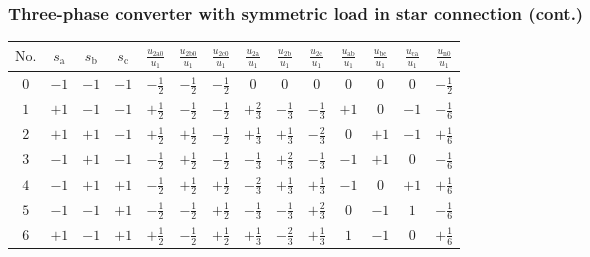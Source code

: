 \begin{frame}[b]
    \frametitle{Three-phase converter with symmetric load in star connection (cont.)}
    \vspace{1em}
    \begin{table}
        \renewcommand{\arraystretch}{1.25}
        \centering
        \begin{tabular}{c c c c c c c c c c c c c c}
            \toprule
            $\mathrm{No.}$ & $s_\mathrm{a}$ & $s_\mathrm{b}$ & $s_\mathrm{c}$ & $\frac{u_{2\mathrm{a}0}}{u_1}$ & $\frac{u_{2\mathrm{b}0}}{u_1}$ & $\frac{u_{2\mathrm{c}0}}{u_1}$ & $\frac{u_{2\mathrm{a}}}{u_1}$ & $\frac{u_{2\mathrm{b}}}{u_1}$ & $\frac{u_{2\mathrm{c}}}{u_1}$ & $\frac{u_{\mathrm{ab}}}{u_1}$ & $\frac{u_{\mathrm{bc}}}{u_1}$ & $\frac{u_{\mathrm{ca}}}{u_1}$ & $\frac{u_{\mathrm{n}0}}{u_1}$ \\
            \midrule
            $0$ & $-1$ & $-1$ & $-1$ & $-\frac{1}{2}$ & $-\frac{1}{2}$ & $-\frac{1}{2}$ & $0$ & $0$ & $0$ & $0$& $0$& $0$&$-\frac{1}{2}$\\

            $1$ & $+1$ & $-1$ & $-1$ & $+\frac{1}{2}$ & $-\frac{1}{2}$ & $-\frac{1}{2}$ & $+\frac{2}{3}$ & $-\frac{1}{3}$ & $-\frac{1}{3}$ & $+1$& $0$& $-1$& $-\frac{1}{6}$\\

            $2$ & $+1$ & $+1$ & $-1$ & $+\frac{1}{2}$ & $+\frac{1}{2}$ & $-\frac{1}{2}$ & $+\frac{1}{3}$ & $+\frac{1}{3}$ & $-\frac{2}{3}$ & $0$& $+1$& $-1$& $+\frac{1}{6}$\\

            $3$ & $-1$ & $+1$ & $-1$ & $-\frac{1}{2}$ & $+\frac{1}{2}$ & $-\frac{1}{2}$ & $-\frac{1}{3}$ & $+\frac{2}{3}$ & $-\frac{1}{3}$ & $-1$& $+1$& $0$& $-\frac{1}{6}$\\

            $4$ & $-1$ & $+1$ & $+1$ & $-\frac{1}{2}$ & $+\frac{1}{2}$ & $+\frac{1}{2}$ & $-\frac{2}{3}$ & $+\frac{1}{3}$ & $+\frac{1}{3}$ & $-1$& $0$& $+1$& $+\frac{1}{6}$\\

            $5$ & $-1$ & $-1$ & $+1$ & $-\frac{1}{2}$ & $-\frac{1}{2}$ & $+\frac{1}{2}$ & $-\frac{1}{3}$ & $-\frac{1}{3}$ & $+\frac{2}{3}$ & $0$& $-1$& $1$& $-\frac{1}{6}$\\

            $6$ & $+1$ & $-1$ & $+1$ & $+\frac{1}{2}$ & $-\frac{1}{2}$ & $+\frac{1}{2}$ & $+\frac{1}{3}$ & $-\frac{2}{3}$ & $+\frac{1}{3}$ & $1$& $-1$& $0$& $+\frac{1}{6}$\\


\end{tabular}
\end{table}
\end{frame}

